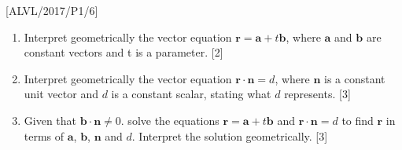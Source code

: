 \item {[}ALVL/2017/P1/6{]}
\begin{enumerate}
\item Interpret geometrically the vector equation $\mathbf{r}=\mathbf{a}+t\mathbf{b}$,
where $\mathbf{a}$ and $\mathbf{b}$ are constant vectors and t is
a parameter.\hfill{} {[}2{]}
\item Interpret geometrically the vector equation $\mathbf{r}\cdot\mathbf{n}=d$,
where $\mathbf{n}$ is a constant unit vector and $d$ is a constant
scalar, stating what $d$ represents.\hfill{} {[}3{]}
\item Given that $\mathbf{b}\cdot\mathbf{n}\ne0$. solve the equations $\mathbf{r}=\mathbf{a}+t\mathbf{b}$
and $\mathbf{r}\cdot\mathbf{n}=d$ to find $\mathbf{r}$ in terms
of $\mathbf{a}$, $\mathbf{b}$, $\mathbf{n}$ and $d$. Interpret
the solution geometrically. \hfill{}{[}3{]}
\end{enumerate}
